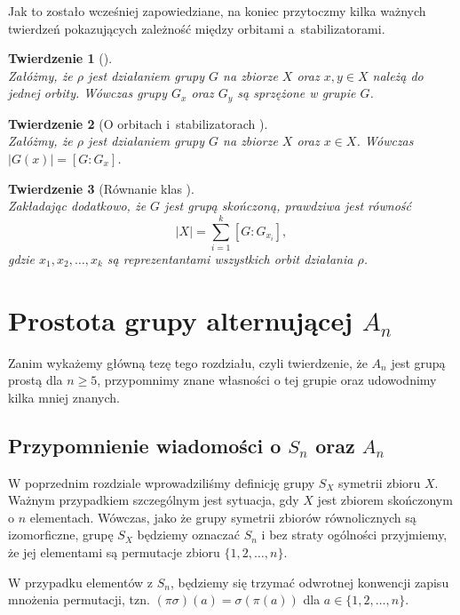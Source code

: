 \documentclass[licencjacka]{pracamgr}
\newtheorem{thh}{Twierdzenie}[section]
\begin{document}
Jak to zostało wcześniej zapowiedziane, na koniec przytoczmy kilka
ważnych twierdzeń pokazujących zależność między orbitami
a~stabilizatorami.

\begin{thh}[{\cite[tw. 1.3.c)]{BB}}]\label{conj_stab} $ $\\
    Załóżmy, że $\rho$ jest działaniem grupy $G$ na zbiorze $X$ oraz $x, y \in X$ należą do jednej orbity.
    Wówczas grupy $G_x$ oraz $G_y$ są sprzężone w grupie $G$.
\end{thh}

\begin{thh}[{O orbitach i~stabilizatorach \cite[stw. 11.3.]{Baginski}}] $ $\\
    Załóżmy, że $\rho$ jest działaniem grupy $G$ na zbiorze $X$ oraz $x\in X$.
    Wówczas $|G(x)| = [G : G_x]$.
\end{thh}

\begin{thh}[{Równanie klas \cite[str. 37]{Lang}}]  $ $\\
    Zakładając dodatkowo, że $G$ jest grupą skończoną, prawdziwa jest równość
    $$ |X| = \sum_{i=1}^k [G : G_{x_i}] ,$$
    gdzie $x_1, x_2, \ldots, x_k$ są reprezentantami wszystkich orbit działania $\rho$.
\end{thh}



\chapter{Prostota grupy alternującej $A_n$}

Zanim wykażemy główną tezę tego rozdziału, czyli twierdzenie, że $A_n$
jest grupą prostą dla $n \ge 5$, przypomnimy znane własności o tej
grupie oraz udowodnimy kilka mniej znanych.

\section{Przypomnienie wiadomości o $S_n$ oraz $A_n$}

W poprzednim rozdziale wprowadziliśmy definicję grupy $S_X$ symetrii
zbioru $X$. Ważnym przypadkiem szczególnym jest sytuacja, gdy $X$
jest zbiorem skończonym o $n$ elementach. Wówczas, jako że grupy
symetrii zbiorów równolicznych są izomorficzne, grupę $S_X$ będziemy
oznaczać $S_n$ i bez straty ogólności przyjmiemy, że jej elementami
są permutacje zbioru $\{1, 2, \ldots, n\}$.

W przypadku elementów z $S_n$, będziemy się trzymać odwrotnej konwencji 
zapisu mnożenia permutacji,
tzn. $(\pi \sigma) (a) = \sigma ( \pi (a) )$ dla $a \in \{1, 2, \ldots, n\}$.
\end{document}

